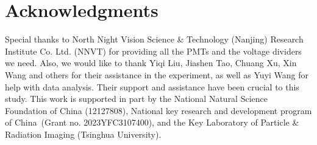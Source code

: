 \section{Acknowledgments}
Special thanks to North Night Vision Science \& Technology (Nanjing) Research Institute Co. Ltd. (NNVT)
for providing all the PMTs and the voltage dividers we need.
Also, we would like to thank Yiqi Liu, Jiashen Tao, Chuang Xu, Xin Wang and others for their assistance in the experiment,
as well as Yuyi Wang for help with data analysis. Their support and assistance have been crucial to this study.
This work is supported in part by the National Natural Science Foundation of China (12127808),
National key research and development program of China~(Grant no. 2023YFC3107400),
and the Key Laboratory of Particle \& Radiation Imaging (Tsinghua University).

